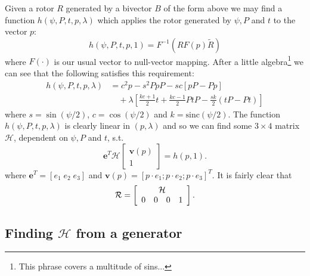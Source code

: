 Given a rotor $R$ generated by a bivector $B$ of the form above we may find
a function $h(\psi, P, t, p, \lambda)$ which applies the rotor generated
by $\psi, P$ and $t$ to the vector $p$:
\[
h(\psi, P, t, p, 1) = F^{-1} \left( R F(p) \tilde{R} \right)
\]
where $F(\cdot)$ is our usual vector to null-vector mapping.
After a little algebra\footnote{This phrase covers a multitude
  of sins...} we can see that the
following satisfies this requirement:
\begin{align}
h(\psi, P, t, p, \lambda) &=c^2p - s^2PpP - sc\left[pP - Pp\right] \nonumber \\
&\quad+ \lambda\left[ 
 \frac{kc+1}{2} t + \frac{kc-1}{2} PtP
- \frac{sk}{2} (tP - Pt)
\right] \label{eqn:defnh}
\end{align}
where $s = \sin(\psi/2)$, $c = \cos(\psi/2)$ and $k = \textrm{sinc}(\psi/2)$.
The function $h(\psi, P, t, p, \lambda)$ is clearly linear in $(p,\lambda)$ and so
we can find some $3\times4$ matrix $\mathcal{H}$, dependent on
$\psi, P$ and $t$, s.t.
\begin{equation}
\mathbf{e}^T 
 \mathcal{H} \left[
\begin{array}{c}
\mathbf{v}(p) \\ 1
\end{array} 
\right] = h(p, 1). \label{eqn:hi}
\end{equation}
where $\mathbf{e}^T = \left[ e_1 \; e_2 \; e_3 \right]$ and
$\mathbf{v} (p) = \left[ p\cdot e_1 ; p \cdot e_2 ; p \cdot e_3 \right]^T$. It is
fairly clear that
\[
\mathcal{R} = \left[
\begin{array}{cccc}
\multicolumn{4}{c}{\mathcal{H}} \\
                 0 & 0 & 0 & 1 
\end{array}
\right].
\]

\subsection{Finding $\mathcal{H}$ from a generator}

